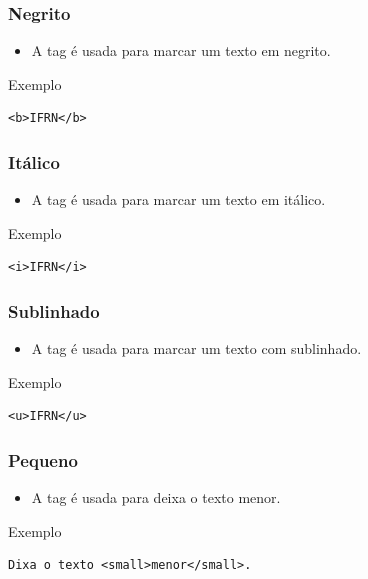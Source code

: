 \documentclass[aspectratio=169]{beamer} %
\begin{document}
\begin{frame}[fragile]
	\frametitle{Negrito}
	
	\begin{itemize}
		\item A tag  é usada para marcar um texto em negrito.
	\end{itemize}\vfill
	
	\begin{exampleblock}{Exemplo}
		\begin{lstlisting}
<b>IFRN</b>
		\end{lstlisting}
	\end{exampleblock}
\end{frame}

\begin{frame}[fragile]
	\frametitle{Itálico}
	
	\begin{itemize}
		\item A tag  é usada para marcar um texto em itálico.
	\end{itemize}\vfill
	
	\begin{exampleblock}{Exemplo}
		\begin{lstlisting}
<i>IFRN</i>
		\end{lstlisting}
	\end{exampleblock}
\end{frame}

\begin{frame}[fragile]
	\frametitle{Sublinhado}
	
	\begin{itemize}
		\item A tag  é usada para marcar um texto com sublinhado.
	\end{itemize}\vfill
	
	\begin{exampleblock}{Exemplo}
		\begin{lstlisting}
<u>IFRN</u>
		\end{lstlisting}
	\end{exampleblock}
\end{frame}

\begin{frame}[fragile]
	\frametitle{Pequeno}
	
	\begin{itemize}
		\item A tag  é usada para deixa o texto menor.
	\end{itemize}\vfill
	
	\begin{exampleblock}{Exemplo}
		\begin{lstlisting}
Dixa o texto <small>menor</small>.
		\end{lstlisting}
	\end{exampleblock}
\end{frame}
\end{document}
